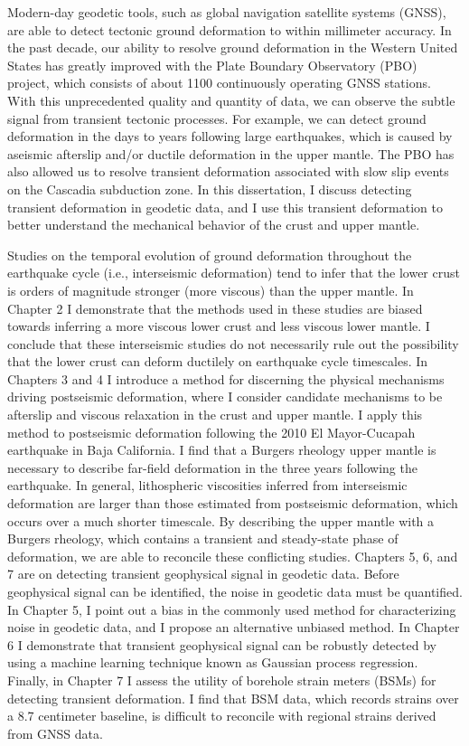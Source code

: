 Modern-day geodetic tools, such as global navigation satellite systems
(GNSS), are able to detect tectonic ground deformation to within
millimeter accuracy. In the past decade, our ability to resolve ground
deformation in the Western United States has greatly improved with the
Plate Boundary Observatory (PBO) project, which consists of about 1100
continuously operating GNSS stations. With this unprecedented quality
and quantity of data, we can observe the subtle signal from transient
tectonic processes. For example, we can detect ground deformation in
the days to years following large earthquakes, which is caused by
aseismic afterslip and/or ductile deformation in the upper mantle. The
PBO has also allowed us to resolve transient deformation associated
with slow slip events on the Cascadia subduction zone. In this
dissertation, I discuss detecting transient deformation in geodetic
data, and I use this transient deformation to better understand the
mechanical behavior of the crust and upper mantle.

Studies on the temporal evolution of ground deformation throughout the
earthquake cycle (i.e., interseismic deformation) tend to infer that
the lower crust is orders of magnitude stronger (more viscous) than
the upper mantle. In Chapter 2 I demonstrate that the methods used in
these studies are biased towards inferring a more viscous lower crust
and less viscous lower mantle. I conclude that these interseismic
studies do not necessarily rule out the possibility that the lower
crust can deform ductilely on earthquake cycle timescales. In Chapters
3 and 4 I introduce a method for discerning the physical mechanisms
driving postseismic deformation, where I consider candidate mechanisms
to be afterslip and viscous relaxation in the crust and upper mantle.
I apply this method to postseismic deformation following the 2010 El
Mayor-Cucapah earthquake in Baja California. I find that a Burgers
rheology upper mantle is necessary to describe far-field deformation
in the three years following the earthquake. In general, lithospheric
viscosities inferred from interseismic deformation are larger than
those estimated from postseismic deformation, which occurs over a much
shorter timescale. By describing the upper mantle with a Burgers
rheology, which contains a transient and steady-state phase of
deformation, we are able to reconcile these conflicting studies.
Chapters 5, 6, and 7 are on detecting transient geophysical signal in
geodetic data. Before geophysical signal can be identified, the noise
in geodetic data must be quantified. In Chapter 5, I point out a bias
in the commonly used method for characterizing noise in geodetic data,
and I propose an alternative unbiased method. In Chapter 6 I
demonstrate that transient geophysical signal can be robustly detected
by using a machine learning technique known as Gaussian process
regression. Finally, in Chapter 7 I assess the utility of borehole
strain meters (BSMs) for detecting transient deformation. I find that
BSM data, which records strains over a 8.7 centimeter baseline, is
difficult to reconcile with regional strains derived from GNSS data. 
